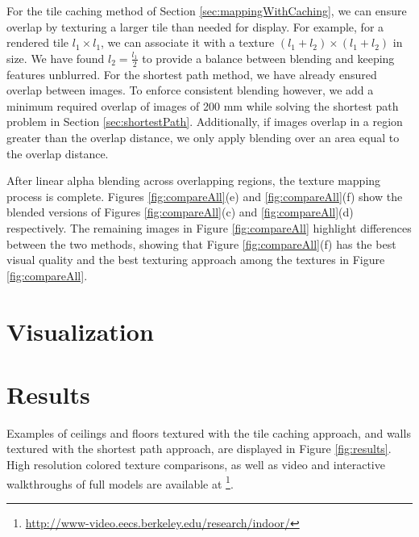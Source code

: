 \documentclass[]{spie}  %
\begin{document}
For the tile caching method of Section \ref{sec:mappingWithCaching},
we can ensure overlap by texturing a larger tile than needed for
display. For example, for a rendered tile $l_1 \times l_1$, we can
associate it with a texture $(l_1 + l_2) \times (l_1 + l_2)$ in size.
We have found $l_2 = \frac{l_1}{2}$ to provide a balance between
blending and keeping features unblurred. For the shortest path method,
we have already ensured overlap between images. To enforce consistent
blending however, we add a minimum required overlap of images of 200
mm while solving the shortest path problem in Section
\ref{sec:shortestPath}. Additionally, if images overlap in a region
greater than the overlap distance, we only apply blending over an area
equal to the overlap distance.

After linear alpha blending across overlapping regions, the texture
mapping process is complete. Figures \ref{fig:compareAll}(e) and
\ref{fig:compareAll}(f) show the blended versions of Figures
\ref{fig:compareAll}(c) and \ref{fig:compareAll}(d) respectively. The
remaining images in Figure \ref{fig:compareAll} highlight differences
between the two methods, showing that Figure \ref{fig:compareAll}(f)
has the best visual quality and the best texturing approach among the
textures in Figure \ref{fig:compareAll}.


\section{Visualization}
\label{sec:visualization}

\section{Results}
\label{sec:results}
Examples of ceilings and floors textured with the tile caching
approach, and walls textured with the shortest path approach, are
displayed in Figure \ref{fig:results}. High resolution colored texture
comparisons, as well as video and interactive walkthroughs of full
models are available at
\footnote{\url{http://www-video.eecs.berkeley.edu/research/indoor/}}.
\end{document}
